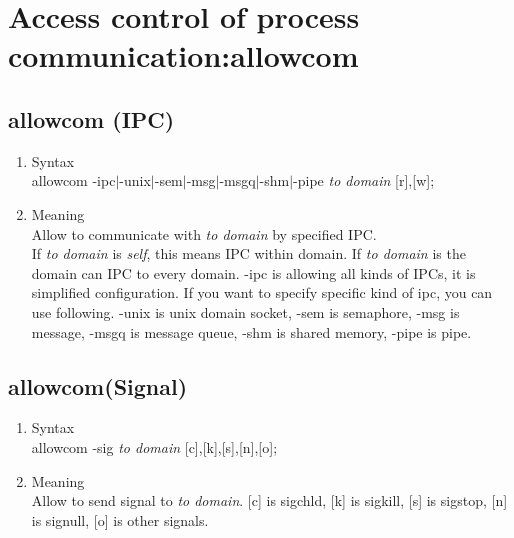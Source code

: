 \documentclass{article}
\begin{document}
\section{Access control of process communication:allowcom}
\subsection{allowcom (IPC)}
\begin{enumerate}
 \item Syntax\\
       allowcom -ipc$\mid$-unix$\mid$-sem$\mid$-msg$\mid$-msgq$\mid$-shm$\mid$-pipe {\it to
       domain} [r],[w];
 \item Meaning\\
       Allow to communicate with {\it  to domain } by specified IPC.\\
       If {\it to domain } is {\it self}, this means IPC within
       domain. If {\it  to domain } is {\it *} the domain can IPC
       to every domain.
       -ipc is allowing all kinds of IPCs, it is simplified
       configuration. If you want to specify specific kind of ipc, you
       can use following.      
       -unix is unix domain socket, -sem is semaphore, -msg is message,
       -msgq is message queue, -shm is shared memory, -pipe is pipe.\\
    
\end{enumerate}

\subsection{allowcom(Signal)}
\begin{enumerate}
 \item Syntax\\
       allowcom -sig {\it to domain} [c],[k],[s],[n],[o];
 \item Meaning\\
       Allow to send signal to {\it to domain}. [c] is sigchld, [k] is
       sigkill, [s] is sigstop, [n] is signull, [o] is other signals. 
\end{enumerate}
\end{document}
